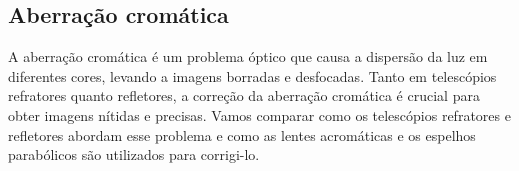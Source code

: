 \documentclass[a4paper, 12pt]{article}
\begin{document}
\subsection{Aberração cromática}
A aberração cromática é um problema óptico que causa a dispersão da luz em diferentes cores, levando a imagens borradas e desfocadas. Tanto em telescópios refratores quanto refletores, a correção da aberração cromática é crucial para obter imagens nítidas e precisas. Vamos comparar como os telescópios refratores e refletores abordam esse problema e como as lentes acromáticas e os espelhos parabólicos são utilizados para corrigi-lo.
\end{document}
